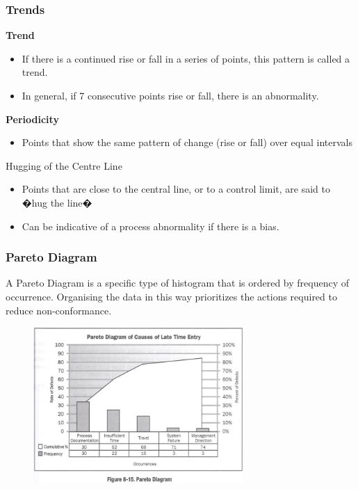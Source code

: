 \begin{frame}
\frametitle{Trends}
\textbf{Trend}
\begin{itemize}
	\item If there is a continued rise or fall in a series of points, this pattern is called a trend.
	\item In general, if 7 consecutive points rise or fall, there is an abnormality.
\end{itemize}
\textbf{Periodicity}
\begin{itemize}
	\item Points that show the same pattern of change (rise or fall) over equal intervals
\end{itemize}
Hugging of the Centre Line
\begin{itemize}
	\item Points that are close to the central line, or to a control limit, are said to �hug the line�
	\item Can be indicative of a process abnormality if there is a bias.
\end{itemize}
\end{frame}



\begin{frame}
\frametitle{Pareto Diagram}
A Pareto Diagram is a specific type of histogram that is ordered by frequency of occurrence.
Organising the data in this way prioritizes the actions required to reduce non-conformance.
\begin{figure}
	\centering
		\includegraphics[width = 8cm]{images/pareto.jpg}
	\label{fig:pareto}
\end{figure}

\end{frame}




